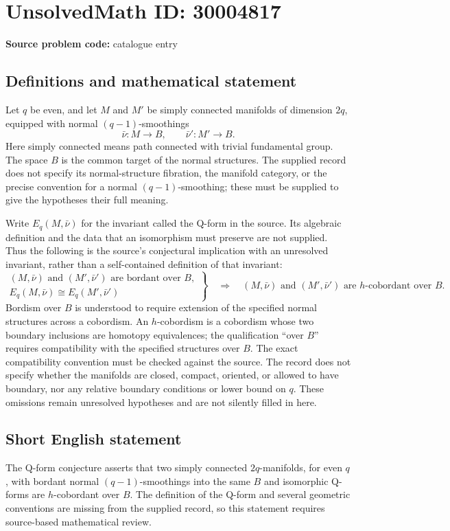\documentclass[11pt]{article}
\begin{document}
\section*{UnsolvedMath ID: 30004817}
\textbf{Source problem code:} catalogue entry
\subsection{Definitions and mathematical statement}
Let \(q\) be even, and let \(M\) and \(M'\) be simply connected manifolds of dimension \(2q\), equipped with normal \((q-1)\)-smoothings
\[
\bar\nu\colon M\longrightarrow B,
\qquad
\bar\nu'\colon M'\longrightarrow B.
\]
Here simply connected means path connected with trivial fundamental group. The space \(B\) is the common target of the normal structures. The supplied record does not specify its normal-structure fibration, the manifold category, or the precise convention for a normal \((q-1)\)-smoothing; these must be supplied to give the hypotheses their full meaning.

Write \(E_q(M,\bar\nu)\) for the invariant called the Q-form in the source. Its algebraic definition and the data that an isomorphism must preserve are not supplied. Thus the following is the source's conjectural implication with an unresolved invariant, rather than a self-contained definition of that invariant:
\[
\left.
\begin{gathered}
(M,\bar\nu)\text{ and }(M',\bar\nu')\text{ are bordant over }B,\\
E_q(M,\bar\nu)\cong E_q(M',\bar\nu')
\end{gathered}
\right\}
\quad\Longrightarrow\quad
(M,\bar\nu)\text{ and }(M',\bar\nu')\text{ are }h\text{-cobordant over }B.
\]
Bordism over \(B\) is understood to require extension of the specified normal structures across a cobordism. An \(h\)-cobordism is a cobordism whose two boundary inclusions are homotopy equivalences; the qualification ``over \(B\)'' requires compatibility with the specified structures over \(B\). The exact compatibility convention must be checked against the source. The record does not specify whether the manifolds are closed, compact, oriented, or allowed to have boundary, nor any relative boundary conditions or lower bound on \(q\). These omissions remain unresolved hypotheses and are not silently filled in here.
\subsection{Short English statement}
The Q-form conjecture asserts that two simply connected \(2q\)-manifolds, for even \(q\), with bordant normal \((q-1)\)-smoothings into the same \(B\) and isomorphic Q-forms are \(h\)-cobordant over \(B\). The definition of the Q-form and several geometric conventions are missing from the supplied record, so this statement requires source-based mathematical review.
\end{document}
